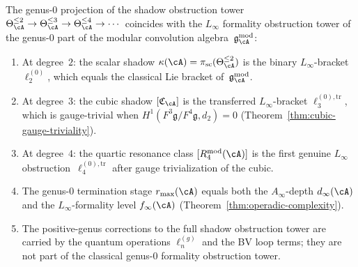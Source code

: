 \begin{proposition}
\label{prop:shadow-linfty-obstruction}%
%
%
The genus-$0$ projection of the shadow obstruction tower
$\Theta_{\cA}^{\leq 2} \to \Theta_{\cA}^{\leq 3}
\to \Theta_{\cA}^{\leq 4} \to \cdots$
coincides with the $L_\infty$ formality obstruction tower of the
genus-$0$ part of the modular convolution algebra~$\gAmod$:
\begin{enumerate}[label=\textup{(\roman*)}]
\item At degree~$2$: the scalar shadow
 $\kappa(\cA) = \pi_{\mathrm{sc}}(\Theta_{\cA}^{\leq 2})$
 is the binary $L_\infty$-bracket $\ell_2^{(0)}$, which equals the
 classical Lie bracket of~$\gAmod$.
\item At degree~$3$: the cubic shadow $[\mathfrak{C}_{\cA}]$ is
 the transferred $L_\infty$-bracket $\ell_3^{(0),\mathrm{tr}}$,
 which is gauge-trivial when
 $H^1(F^3\mathfrak{g}/F^4\mathfrak{g}, d_2) = 0$
 (Theorem~\ref{thm:cubic-gauge-triviality}).
\item At degree~$4$: the quartic resonance class
 $[R^{\mathrm{mod}}_4(\cA)]$ is the first genuine $L_\infty$
 obstruction~$\ell_4^{(0),\mathrm{tr}}$
 after gauge trivialization of the cubic.
\item The genus-$0$ termination stage $r_{\max}(\cA)$ equals both the
 $A_\infty$-depth $d_\infty(\cA)$ and the
 $L_\infty$-formality level $f_\infty(\cA)$
 (Theorem~\ref{thm:operadic-complexity}).
\item The positive-genus corrections to the full shadow obstruction tower are
 carried by the quantum operations $\ell_n^{(g)}$ and the BV loop
 terms; they are not part of the classical genus-$0$ formality
 obstruction tower.
\end{enumerate}
\end{proposition}

